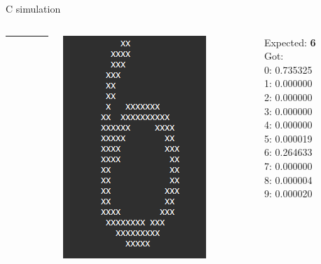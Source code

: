 \documentclass[10pt, xcolor=dvipsnames, compress]{beamer}
\begin{document}
\begin{frame}{C simulation}
\begin{spacing}{0.9}
\begin{columns}[T]
        \begin{column}{.01\textwidth}
            \rule{.1mm}{0.4\textheight}
        \end{column}

        \begin{column}{.15\textwidth}
            \includegraphics[width=\textwidth]{6-bad-class.png}
        \end{column}
        \begin{column}{.15\textwidth}
            \scriptsize
            Expected: \textbf{6}\\[2ex]
            Got:\\
            0: 0.735325\\
            1: 0.000000\\
            2: 0.000000\\
            3: 0.000000\\
            4: 0.000000\\
            5: 0.000019\\
            6: 0.264633\\
            7: 0.000000\\
            8: 0.000004\\
            9: 0.000020


\end{column}
\end{columns}
\end{spacing}
\end{frame}
\end{document}
